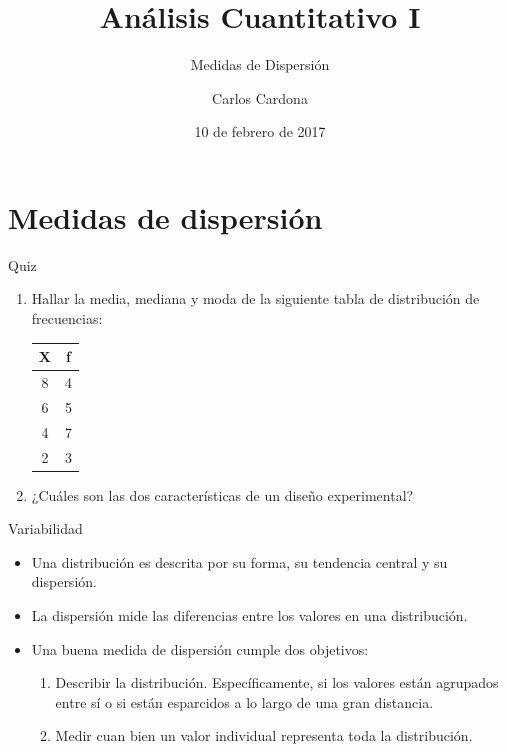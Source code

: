 \documentclass[xcolor=dvipsnames]{beamer}
\author[Carlos Cardona]{Carlos Cardona}
\title{Análisis Cuantitativo I}
\subtitle{Medidas de Dispersión}
\institute[URosario]{Universidad del Rosario}
\date{10 de febrero de 2017}
\begin{document}
\maketitle

\section{Medidas de dispersión}
\begin{frame}{Quiz}
\begin{enumerate}
\item Hallar la media, mediana y moda de la siguiente tabla de distribución de frecuencias: 
\begin{center}
	\begin{table}[H]
		\begin{tabular}{cc} \hline
			X & f \\ \hline
			8&4 \\
			6&5 \\
			4&7 \\
			2&3 \\ \hline
		\end{tabular}
	\end{table}
\end{center}
\item ¿Cuáles son las dos características de un diseño experimental?
\end{enumerate}
\end{frame}
\begin{frame}{Variabilidad}
\begin{itemize}
\justifying
\item Una distribución es descrita por su forma, su tendencia central y su dispersión.
\item La dispersión mide las diferencias entre los valores en una distribución.
\item Una buena medida de dispersión cumple dos objetivos:
\begin{enumerate}
\item Describir la distribución. Específicamente, si los valores están agrupados entre sí o si están esparcidos a lo largo de una gran distancia.
\item Medir cuan bien un valor individual representa toda la distribución.
\end{enumerate}
\end{itemize}
\end{frame}
\end{document}
